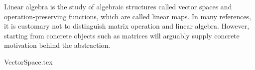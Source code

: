 \label{chap:linalg}

Linear algebra is the study of algebraic structures called vector spaces
and operation-preserving functions, which are called linear maps.
In many references,
it is customary not to distinguish matrix operation and linear algebra.
However, starting from concrete objects such as matrices
will arguably supply concrete motivation behind the abstraction.

{VectorSpace.tex}